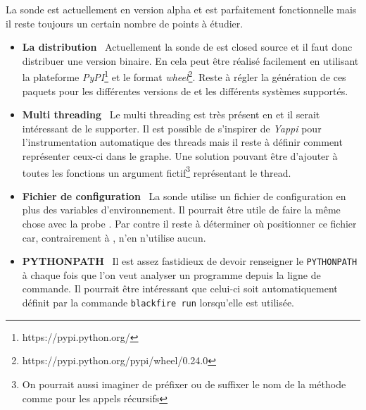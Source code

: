 La sonde \Python est actuellement en version alpha et est parfaitement fonctionnelle mais il reste toujours un certain nombre de points à étudier.

\begin{itemize}
\item \textbf{La distribution}\;~ Actuellement la sonde de \Blackfire est \gls{closed source} et il faut donc distribuer une version binaire. En \Python cela peut être réalisé facilement en utilisant la plateforme \emph{PyPI}\footnote{https://pypi.python.org/} et le format \emph{wheel}\footnote{https://pypi.python.org/pypi/wheel/0.24.0}. Reste à régler la génération de ces paquets pour les différentes versions de \Python et les différents systèmes supportés.
\item \textbf{Multi threading}\;~ Le multi threading est très présent en \Python et il serait intéressant de le supporter. Il est possible de s'inspirer de \emph{Yappi} pour l'instrumentation automatique des threads mais il reste à définir comment représenter ceux-ci dans le graphe. Une solution pouvant être d'ajouter à toutes les fonctions un argument fictif\footnote{On pourrait aussi imaginer de préfixer ou de suffixer le nom de la méthode comme pour les appels récursifs} représentant le thread.
\item \textbf{Fichier de configuration}\;~ La sonde \PHP utilise un fichier de configuration en plus des variables d'environnement. Il pourrait être utile de faire la même chose avec la probe \Python. Par contre il reste à déterminer où positionner ce fichier car, contrairement à \PHP, \Python n'en n'utilise aucun.
\item \textbf{PYTHONPATH}\;~ Il est assez fastidieux de devoir renseigner le \verb|PYTHONPATH| à chaque fois que l'on veut analyser un programme depuis la ligne de commande. Il pourrait être intéressant que celui-ci soit automatiquement définit par la commande \verb|blackfire run| lorsqu'elle est utilisée.
\end{itemize}
  	
  	

